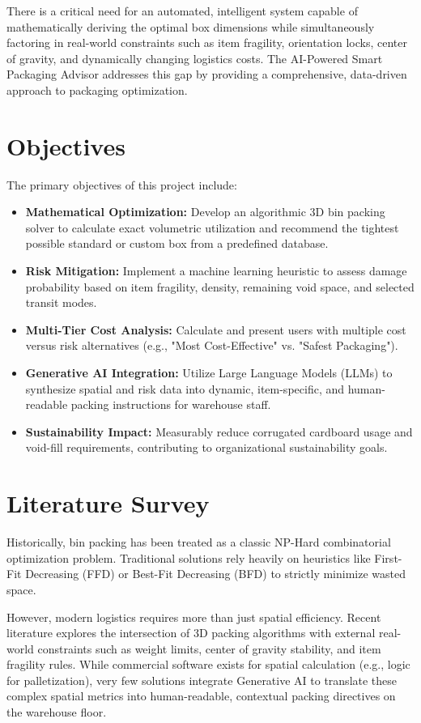 \documentclass[12pt,a4paper]{article}
\begin{document}
There is a critical need for an automated, intelligent system capable of mathematically deriving the optimal box dimensions while simultaneously factoring in real-world constraints such as item fragility, orientation locks, center of gravity, and dynamically changing logistics costs. The AI-Powered Smart Packaging Advisor addresses this gap by providing a comprehensive, data-driven approach to packaging optimization.

\section{Objectives}
The primary objectives of this project include:
\begin{itemize}
    \item \textbf{Mathematical Optimization:} Develop an algorithmic 3D bin packing solver to calculate exact volumetric utilization and recommend the tightest possible standard or custom box from a predefined database.
    \item \textbf{Risk Mitigation:} Implement a machine learning heuristic to assess damage probability based on item fragility, density, remaining void space, and selected transit modes.
    \item \textbf{Multi-Tier Cost Analysis:} Calculate and present users with multiple cost versus risk alternatives (e.g., "Most Cost-Effective" vs. "Safest Packaging").
    \item \textbf{Generative AI Integration:} Utilize Large Language Models (LLMs) to synthesize spatial and risk data into dynamic, item-specific, and human-readable packing instructions for warehouse staff.
    \item \textbf{Sustainability Impact:} Measurably reduce corrugated cardboard usage and void-fill requirements, contributing to organizational sustainability goals.
\end{itemize}

\section{Literature Survey}
Historically, bin packing has been treated as a classic NP-Hard combinatorial optimization problem. Traditional solutions rely heavily on heuristics like First-Fit Decreasing (FFD) or Best-Fit Decreasing (BFD) to strictly minimize wasted space. 

However, modern logistics requires more than just spatial efficiency. Recent literature explores the intersection of 3D packing algorithms with external real-world constraints such as weight limits, center of gravity stability, and item fragility rules. While commercial software exists for spatial calculation (e.g., logic for palletization), very few solutions integrate Generative AI to translate these complex spatial metrics into human-readable, contextual packing directives on the warehouse floor.
\end{document}
